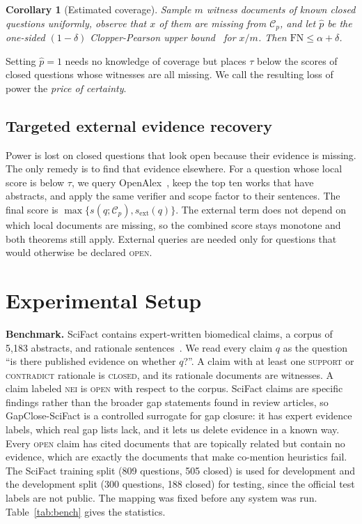 \documentclass[conference,a4paper]{IEEEtran}
\newtheorem{corollary}{Corollary}
\theoremstyle{definition}
\newcommand{\open}{\textup{\textsc{open}}}
\newcommand{\closed}{\textup{\textsc{closed}}}
\begin{document}
\begin{corollary}[Estimated coverage]
Sample $m$ witness documents of known closed questions uniformly, observe that $x$ of them are missing from $\mathcal{C}_p$, and let $\hat p$ be the one-sided $(1-\delta)$ Clopper-Pearson upper bound~\cite{clopper1934} for $x/m$. Then $\mathrm{FN}\le\alpha+\delta$.
\end{corollary}

Setting $\hat p=1$ needs no knowledge of coverage but places $\tau$ below the scores of closed questions whose witnesses are all missing. We call the resulting loss of power the \emph{price of certainty}.

\subsection{Targeted external evidence recovery}
Power is lost on closed questions that look open because their evidence is missing. The only remedy is to find that evidence elsewhere. For a question whose local score is below $\tau$, we query OpenAlex~\cite{priem2022}, keep the top ten works that have abstracts, and apply the same verifier and scope factor to their sentences. The final score is $\max\{s(q;\mathcal{C}_p), s_{\mathrm{ext}}(q)\}$. The external term does not depend on which local documents are missing, so the combined score stays monotone and both theorems still apply. External queries are needed only for questions that would otherwise be declared \open{}.

\section{Experimental Setup}
\textbf{Benchmark.} SciFact contains expert-written biomedical claims, a corpus of 5,183 abstracts, and rationale sentences~\cite{wadden2020}. We read every claim $q$ as the question ``is there published evidence on whether $q$?''. A claim with at least one \textsc{support} or \textsc{contradict} rationale is \closed{}, and its rationale documents are witnesses. A claim labeled \textsc{nei} is \open{} with respect to the corpus. SciFact claims are specific findings rather than the broader gap statements found in review articles, so GapClose-SciFact is a controlled surrogate for gap closure: it has expert evidence labels, which real gap lists lack, and it lets us delete evidence in a known way. Every \open{} claim has cited documents that are topically related but contain no evidence, which are exactly the documents that make co-mention heuristics fail. The SciFact training split (809 questions, 505 closed) is used for development and the development split (300 questions, 188 closed) for testing, since the official test labels are not public. The mapping was fixed before any system was run. Table~\ref{tab:bench} gives the statistics.
\end{document}

